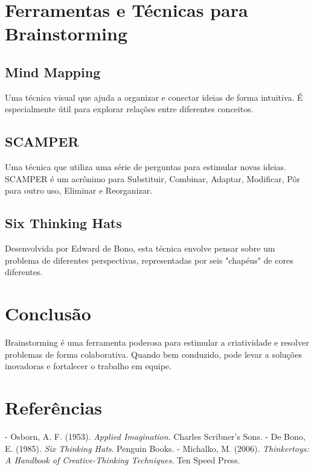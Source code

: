 \documentclass{ufersa}
\begin{document}
\section{Ferramentas e Técnicas para Brainstorming}
\subsection{Mind Mapping}
Uma técnica visual que ajuda a organizar e conectar ideias de forma intuitiva. É especialmente útil para explorar relações entre diferentes conceitos.

\subsection{SCAMPER}
Uma técnica que utiliza uma série de perguntas para estimular novas ideias. SCAMPER é um acrônimo para Substituir, Combinar, Adaptar, Modificar, Pôr para outro uso, Eliminar e Reorganizar.

\subsection{Six Thinking Hats}
Desenvolvida por Edward de Bono, esta técnica envolve pensar sobre um problema de diferentes perspectivas, representadas por seis "chapéus" de cores diferentes.

\section{Conclusão}
Brainstorming é uma ferramenta poderosa para estimular a criatividade e resolver problemas de forma colaborativa. Quando bem conduzido, pode levar a soluções inovadoras e fortalecer o trabalho em equipe.

\section{Referências}
- Osborn, A. F. (1953). \textit{Applied Imagination}. Charles Scribner's Sons.
- De Bono, E. (1985). \textit{Six Thinking Hats}. Penguin Books.
- Michalko, M. (2006). \textit{Thinkertoys: A Handbook of Creative-Thinking Techniques}. Ten Speed Press.
\end{document}
